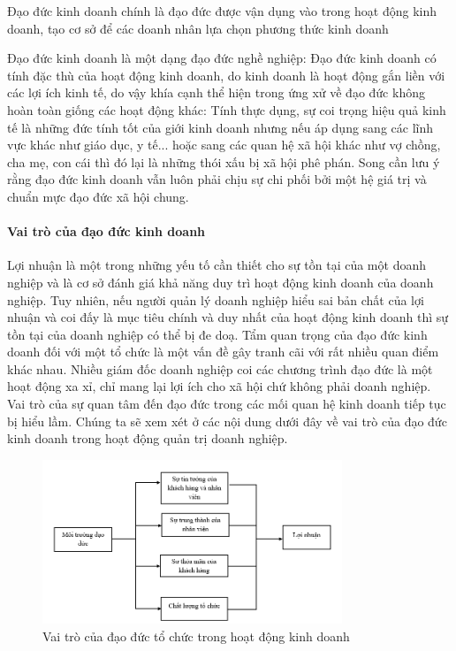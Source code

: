 \documentclass{article}
\begin{document}
            \vspace{0.2cm}
            Đạo đức kinh doanh chính là đạo đức được vận dụng vào trong hoạt động kinh doanh, tạo cơ sở để các doanh nhân lựa chọn phương thức kinh doanh
            
            \vspace{0.2cm}
            Đạo đức kinh doanh là một dạng đạo đức nghề nghiệp: Đạo đức kinh doanh có tính đặc thù của hoạt động kinh doanh, do kinh doanh là hoạt động gắn liền với các lợi ích kinh tế, do vậy khía cạnh thể hiện trong ứng xử về đạo đức không hoàn toàn giống các hoạt động khác: Tính thực dụng, sự coi trọng hiệu quả kinh tế là những đức tính tốt của giới kinh doanh nhưng nếu áp dụng sang các lĩnh vực khác như giáo dục, y tế... hoặc sang các quan hệ xã hội khác như vợ chồng, cha mẹ, con cái thì đó lại là những thói xấu bị xã hội phê phán. Song cần lưu ý rằng đạo đức kinh doanh vẫn luôn phải chịu sự chi phối bởi một hệ giá trị và chuẩn mực đạo đức xã hội chung.

        \paragraph{Vai trò của đạo đức kinh doanh}
            \vspace{0.2cm}
            Lợi nhuận là một trong những yếu tố cần thiết cho sự tồn tại của một doanh nghiệp và là cơ sở đánh giá khả năng duy trì hoạt động kinh doanh của doanh nghiệp. Tuy nhiên, nếu người quản lý doanh nghiệp hiểu sai bản chất của lợi nhuận và coi đấy là mục tiêu chính và duy nhất của hoạt động kinh doanh thì sự tồn tại của doanh nghiệp có thể bị đe doạ. Tẩm quan trọng của đạo đức kinh doanh đối với một tổ chức là một vấn đề gây tranh cãi với rất nhiều quan điểm khác nhau. Nhiều giám đốc doanh nghiệp coi các chương trình đạo đức là một hoạt động xa xỉ, chỉ mang lại lợi ích cho xã hội chứ không phải doanh nghiệp. Vai trò của sự quan tâm đến đạo đức trong các mối quan hệ kinh doanh tiếp tục bị hiểu lầm. Chúng ta sẽ xem xét ở các nội dung dưới đây về vai trò của đạo đức kinh doanh trong hoạt động quản trị doanh nghiệp.

            \begin{figure}[H]
                \centering
                \includegraphics[width=0.8\textwidth]{assert/img1.png}
                \caption{Vai trò của đạo đức tổ chức trong hoạt động kinh doanh}
                \label{fig:img1}
            \end{figure}
\end{document}
